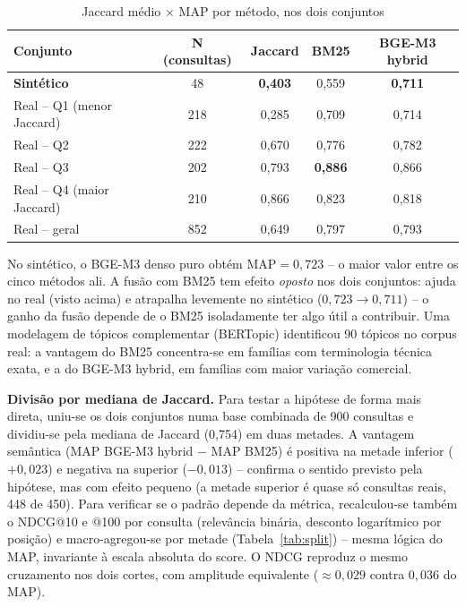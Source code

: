 \documentclass[12pt]{article}
\begin{document}
\begin{table}[ht]
\centering
\small
\caption{Jaccard m\'edio $\times$ MAP por m\'etodo, nos dois conjuntos}
\label{tab:jaccard}
\begin{tabular}{|l|c|c|c|c|}
\hline
\textbf{Conjunto} & \textbf{N (consultas)} & \textbf{Jaccard} & \textbf{BM25} & \textbf{BGE-M3 hybrid} \\
\hline
\textbf{Sint\'etico} & 48 & \textbf{0,403} & 0,559 & \textbf{0,711} \\
\hline
Real -- Q1 (menor Jaccard) & 218 & 0,285 & 0,709 & 0,714 \\
\hline
Real -- Q2 & 222 & 0,670 & 0,776 & 0,782 \\
\hline
Real -- Q3 & 202 & 0,793 & \textbf{0,886} & 0,866 \\
\hline
Real -- Q4 (maior Jaccard) & 210 & 0,866 & 0,823 & 0,818 \\
\hline
Real -- geral & 852 & 0,649 & 0,797 & 0,793 \\
\hline
\end{tabular}
\end{table}

No sint\'etico, o BGE-M3 denso puro obt\'em MAP$=0{,}723$ -- o maior valor entre os cinco m\'etodos ali. A fus\~ao com BM25 tem efeito \emph{oposto} nos dois conjuntos: ajuda no real (visto acima) e atrapalha levemente no sint\'etico ($0{,}723\rightarrow0{,}711$) -- o ganho da fus\~ao depende de o BM25 isoladamente ter algo \'util a contribuir. Uma modelagem de t\'opicos complementar (BERTopic) identificou 90 t\'opicos no corpus real: a vantagem do BM25 concentra-se em fam\'ilias com terminologia t\'ecnica exata, e a do BGE-M3 hybrid, em fam\'ilias com maior varia\c{c}\~ao comercial.

\textbf{Divis\~ao por mediana de Jaccard.} Para testar a hip\'otese de forma mais direta, uniu-se os dois conjuntos numa base combinada de 900 consultas e dividiu-se pela mediana de Jaccard (0,754) em duas metades. A vantagem sem\^antica (MAP BGE-M3 hybrid $-$ MAP BM25) \'e positiva na metade inferior ($+0{,}023$) e negativa na superior ($-0{,}013$) -- confirma o sentido previsto pela hip\'otese, mas com efeito pequeno (a metade superior \'e quase s\'o consultas reais, 448 de 450). Para verificar se o padr\~ao depende da m\'etrica, recalculou-se tamb\'em o NDCG@10 e @100 por consulta (relev\^ancia bin\'aria, desconto logar\'itmico por posi\c{c}\~ao) e macro-agregou-se por metade (Tabela~\ref{tab:split}) -- mesma l\'ogica do MAP, invariante \`a escala absoluta do score. O NDCG reproduz o mesmo cruzamento nos dois cortes, com amplitude equivalente ($\approx0{,}029$ contra $0{,}036$ do MAP).
\end{document}
